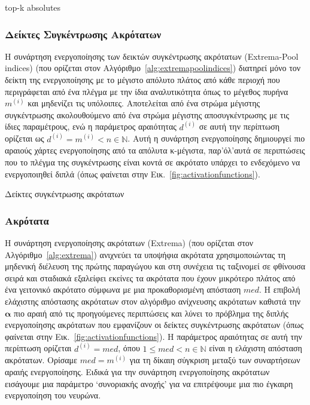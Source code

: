 \begin{algorithm}[H]
	\caption{top-k absolutes}
	\label{alg:topk_absolutes}
	
\end{algorithm}

\subsubsection{Δείκτες Συγκέντρωσης Ακρότατων}
\label{sec6:extremapoolindices}
Η συνάρτηση ενεργοποίησης των δεικτών συγκέντρωσης ακρότατων (Extrema-Pool indices) (που ορίζεται στον Αλγόριθμο~\ref{alg:extremapoolindices}) διατηρεί μόνο τον δείκτη της ενεργοποίησης με το μέγιστο απόλυτο πλάτος από κάθε περιοχή που περιγράφεται από ένα πλέγμα με την ίδια αναλυτικότητα όπως το μέγεθος πυρήνα $m^{(i)}$ και μηδενίζει τις υπόλοιπες.
Αποτελείται από ένα στρώμα μέγιστης συγκέντρωσης ακολουθούμενο από ένα στρώμα μέγιστης αποσυγκέντρωσης με τις ίδιες παραμέτρους, ενώ η παράμετρος αραιότητας $d^{(i)}$ σε αυτή την περίπτωση ορίζεται ως $d^{(i)} = m^{(i)} <n \in \mathbb{N}$.
Αυτή η συνάρτηση ενεργοποίησης δημιουργεί πιο αραιούς χάρτες ενεργοποίησης από τα απόλυτα κ-μέγιστα, παρ'όλ'αυτά σε περιπτώσεις που το πλέγμα της συγκέντρωσης είναι κοντά σε ακρότατο υπάρχει το ενδεχόμενο να ενεργοποιηθεί διπλά (όπως φαίνεται στην Εικ.~\ref{fig:activationfunctions}).

\begin{algorithm}[H]
	\caption{Δείκτες συγκέντρωσης ακρότατων}
	\label{alg:extremapoolindices}
	
\end{algorithm}

\subsubsection{Ακρότατα}
\label{sec6:extrema}
Η συνάρτηση ενεργοποίησης ακρότατων (Extrema) (που ορίζεται στον Αλγόριθμο~\ref{alg:extrema}) ανιχνεύει τα υποψήφια ακρότατα χρησιμοποιώντας τη μηδενική διέλευση της πρώτης παραγώγου και στη συνέχεια τις ταξινομεί σε φθίνουσα σειρά και σταδιακά εξαλείφει εκείνες τα ακρότατα που έχουν μικρότερο πλάτος από ένα γειτονικό ακρότατο σύμφωνα με μια προκαθορισμένη απόσταση $med$.
Η επιβολή ελάχιστης απόστασης ακρότατων στον αλγόριθμο ανίχνευσης ακρότατων καθιστά την $\bm{\alpha}$ πιο αραιή από τις προηγούμενες περιπτώσεις και λύνει το πρόβλημα της διπλής ενεργοποίησης ακρότατων που εμφανίζουν οι δείκτες συγκέντρωσης ακρότατων (όπως φαίνεται στην Εικ.~\ref{fig:activationfunctions}).
Η παράμετρος αραιότητας σε αυτή την περίπτωση ορίζεται $d^{(i)} = med$, όπου $1 \le med <n \in \mathbb{N}$ είναι η ελάχιστη απόσταση ακρότατων.
Ορίσαμε $med = m^{(i)}$ για τη δίκαιη σύγκριση μεταξύ των συναρτήσεων αραιής ενεργοποίησης.
Ειδικά για την συνάρτηση ενεργοποίησης ακρότατων εισάγουμε μια παράμετρο `συνοριακής ανοχής' για να επιτρέψουμε μια πιο έγκαιρη ενεργοποίηση του νευρώνα.


